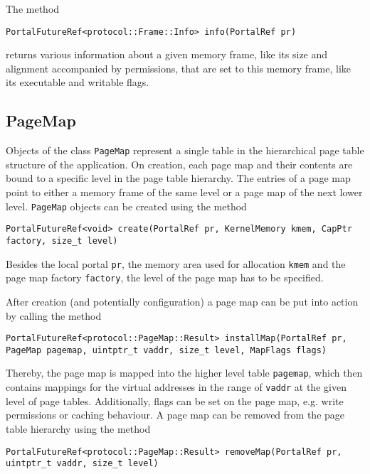The method
\lstset{language=c++,numbers=none}
\begin{lstlisting}
PortalFutureRef<protocol::Frame::Info> info(PortalRef pr)
\end{lstlisting}
\noindent returns various information about a given memory frame, like its size and
alignment accompanied by permissions, that are set to this memory frame, like
its executable and writable flags.

\subsection{PageMap}
Objects of the class \texttt{PageMap} represent a single table in the
hierarchical page table structure of the application. On creation, each page map
and their contents are bound to a specific level in the page table hierarchy.
The entries of a page map point to either a memory frame of the same level or a
page map of the next lower level.
\texttt{PageMap} objects can be created using the method
\lstset{language=c++,numbers=none}
\begin{lstlisting}
PortalFutureRef<void> create(PortalRef pr, KernelMemory kmem, CapPtr factory, size_t level)
\end{lstlisting}
\noindent Besides the local portal \texttt{pr}, the memory area
used for allocation \texttt{kmem} and the page map factory \texttt{factory}, the
level of the page map has to be specified.

After creation (and potentially configuration) a page map can be put into action
by calling the method
\lstset{language=c++,numbers=none}
\begin{lstlisting}
PortalFutureRef<protocol::PageMap::Result> installMap(PortalRef pr, PageMap pagemap, uintptr_t vaddr, size_t level, MapFlags flags)
\end{lstlisting}
\noindent Thereby, the page map is mapped into the higher level table
\texttt{pagemap}, which then contains mappings for the virtual addresses in the
range of \texttt{vaddr} at the given level of page tables. Additionally, flags
can be set on the page map, e.g. write permissions or caching behaviour. A page
map can be removed from the page table hierarchy using the method
\lstset{language=c++,numbers=none}
\begin{lstlisting}
PortalFutureRef<protocol::PageMap::Result> removeMap(PortalRef pr, uintptr_t vaddr, size_t level)
\end{lstlisting}

